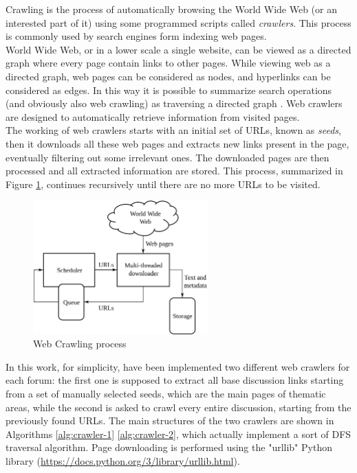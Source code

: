 Crawling is the process of automatically browsing the World Wide Web (or an interested part of it) using some programmed scripts called \textit{crawlers}. This process is commonly used by search engines form indexing web pages.\\
World Wide Web, or in a lower scale a single website, can be viewed as a directed graph where every page contain links to other pages. While viewing web as a directed graph, web pages can be considered as nodes, and hyperlinks can be considered as edges. In this way it is possible to summarize search operations (and obviously also web crawling) as traversing a directed graph \cite{article-web-crawling}. Web crawlers are designed to automatically retrieve information from visited pages.\\
The working of web crawlers starts with an initial set of URLs, known as \textit{seeds}, then it downloads all these web pages and extracts new links present in the page, eventually filtering out some irrelevant ones. The downloaded pages are then processed and all extracted information are stored. This process, summarized in Figure \ref{fig:web-crawler}, continues recursively until there are no more URLs to be visited. 

\begin{figure}[ht]
	\centering
	\includegraphics[width=0.6\textwidth]{figures/web-crawler.png}
	\caption{Web Crawling process}
	\label{fig:web-crawler}
\end{figure}

In this work, for simplicity, have been implemented two different web crawlers for each forum: the first one is supposed to extract all base discussion links starting from a set of manually selected seeds, which are the main pages of thematic areas, while the second is asked to crawl every entire discussion, starting from the previously found URLs. The main structures of the two crawlers are shown in Algorithms \ref{alg:crawler-1} \ref{alg:crawler-2}, which actually implement a sort of \ac{DFS} traversal algorithm. Page downloading is performed using the "urllib" Python library (\url{https://docs.python.org/3/library/urllib.html}).

